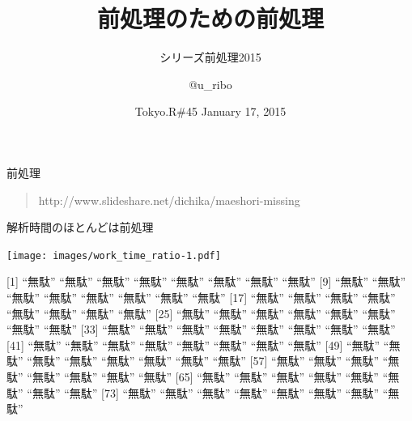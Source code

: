 \documentclass[ignorenonframetext,]{beamer}
\title{前処理のための前処理}
\subtitle{シリーズ前処理2015}
\author{@u\_ribo}
\date{Tokyo.R\#45 January 17, 2015}
\begin{document}
\frame{\titlepage}

\begin{frame}


\end{frame}

\begin{frame}{\faFood 前処理}


\begin{quote}
\scriptsize{\faLink http://www.slideshare.net/dichika/maeshori-missing}
\end{quote}

\end{frame}

\begin{frame}{\faTime 解析時間のほとんどは前処理}

\texttt{[image: images/work\_time\_ratio-1.pdf]}


\end{frame}

\begin{frame}

{[}1{]} ``無駄'' ``無駄'' ``無駄'' ``無駄'' ``無駄'' ``無駄'' ``無駄''
``無駄'' {[}9{]} ``無駄'' ``無駄'' ``無駄'' ``無駄'' ``無駄'' ``無駄''
``無駄'' ``無駄'' {[}17{]} ``無駄'' ``無駄'' ``無駄'' ``無駄'' ``無駄''
``無駄'' ``無駄'' ``無駄'' {[}25{]} ``無駄'' ``無駄'' ``無駄'' ``無駄''
``無駄'' ``無駄'' ``無駄'' ``無駄'' {[}33{]} ``無駄'' ``無駄'' ``無駄''
``無駄'' ``無駄'' ``無駄'' ``無駄'' ``無駄'' {[}41{]} ``無駄'' ``無駄''
``無駄'' ``無駄'' ``無駄'' ``無駄'' ``無駄'' ``無駄'' {[}49{]} ``無駄''
``無駄'' ``無駄'' ``無駄'' ``無駄'' ``無駄'' ``無駄'' ``無駄'' {[}57{]}
``無駄'' ``無駄'' ``無駄'' ``無駄'' ``無駄'' ``無駄'' ``無駄'' ``無駄''
{[}65{]} ``無駄'' ``無駄'' ``無駄'' ``無駄'' ``無駄'' ``無駄'' ``無駄''
``無駄'' {[}73{]} ``無駄'' ``無駄'' ``無駄'' ``無駄'' ``無駄'' ``無駄''
``無駄'' ``無駄''

\end{frame}
\end{document}
